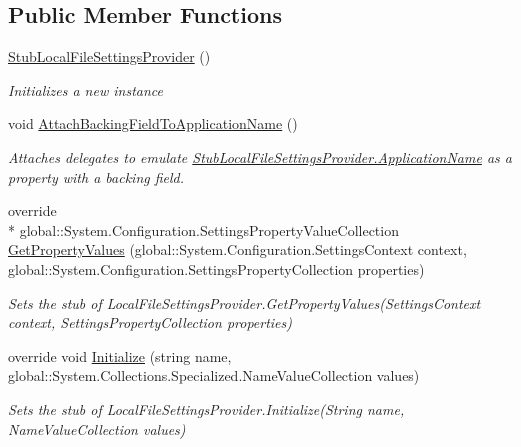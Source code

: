 \subsection*{Public Member Functions}
\begin{DoxyCompactItemize}
\item 
\hyperlink{class_system_1_1_configuration_1_1_fakes_1_1_stub_local_file_settings_provider_a457f3b8f4e3a041a31bdfdc47d627e0f}{Stub\-Local\-File\-Settings\-Provider} ()
\begin{DoxyCompactList}\small\item\em Initializes a new instance\end{DoxyCompactList}\item 
void \hyperlink{class_system_1_1_configuration_1_1_fakes_1_1_stub_local_file_settings_provider_abac652e3e3d41c11f085354ed3e8da3b}{Attach\-Backing\-Field\-To\-Application\-Name} ()
\begin{DoxyCompactList}\small\item\em Attaches delegates to emulate \hyperlink{class_system_1_1_configuration_1_1_fakes_1_1_stub_local_file_settings_provider_a649047c0f52d093bd5f410030531fea8}{Stub\-Local\-File\-Settings\-Provider.\-Application\-Name} as a property with a backing field.\end{DoxyCompactList}\item 
override \\*
global\-::\-System.\-Configuration.\-Settings\-Property\-Value\-Collection \hyperlink{class_system_1_1_configuration_1_1_fakes_1_1_stub_local_file_settings_provider_a55518706bf50733941e1063b7cb98dce}{Get\-Property\-Values} (global\-::\-System.\-Configuration.\-Settings\-Context context, global\-::\-System.\-Configuration.\-Settings\-Property\-Collection properties)
\begin{DoxyCompactList}\small\item\em Sets the stub of Local\-File\-Settings\-Provider.\-Get\-Property\-Values(\-Settings\-Context context, Settings\-Property\-Collection properties)\end{DoxyCompactList}\item 
override void \hyperlink{class_system_1_1_configuration_1_1_fakes_1_1_stub_local_file_settings_provider_a0270716793284f75050a440470b8f04c}{Initialize} (string name, global\-::\-System.\-Collections.\-Specialized.\-Name\-Value\-Collection values)
\begin{DoxyCompactList}\small\item\em Sets the stub of Local\-File\-Settings\-Provider.\-Initialize(\-String name, Name\-Value\-Collection values)\end{DoxyCompactList}\item 

\end{DoxyCompactItemize}
